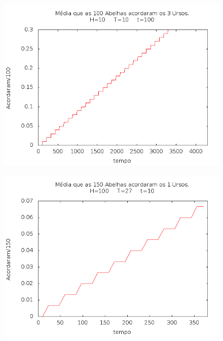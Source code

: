 \documentclass[12pt,a4paper]{article}
\begin{document}
\begin{figure}[!htb]
\centering
\includegraphics[width=0.7\paperwidth]{./graficos/abelhas_100_3_10_100_10.png}
\label{Rotulo}
\end{figure}

\begin{figure}[!htb]
\centering
\includegraphics[width=0.7\paperwidth]{./graficos/abelhas_150_1_100_10_27.png}
\label{Rotulo}
\end{figure}
\end{document}
